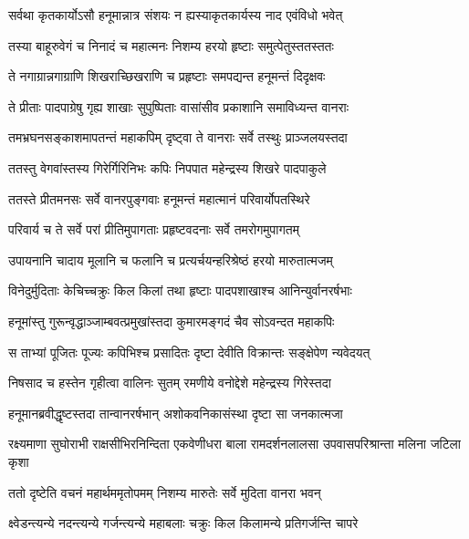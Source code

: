 \twolineshloka
{सर्वथा कृतकार्योऽसौ हनूमान्नात्र संशयः}
{न ह्यस्याकृतकार्यस्य नाद एवंविधो भवेत्} %

\twolineshloka
{तस्या बाहूरुवेगं च निनादं च महात्मनः}
{निशम्य हरयो हृष्टाः समुत्पेतुस्ततस्ततः} %

\twolineshloka
{ते नगाग्रान्नगाग्राणि शिखराच्छिखराणि च}
{प्रहृष्टाः समपद्यन्त हनूमन्तं दिदृक्षवः} %

\twolineshloka
{ते प्रीताः पादपाग्रेषु गृह्य शाखाः सुपुष्पिताः}
{वासांसीव प्रकाशानि समाविध्यन्त वानराः} %

\twolineshloka
{तमभ्रघनसङ्काशमापतन्तं महाकपिम्}
{दृष्ट्वा ते वानराः सर्वे तस्थुः प्राञ्जलयस्तदा} %

\twolineshloka
{ततस्तु वेगवांस्तस्य गिरेर्गिरिनिभः कपिः}
{निपपात महेन्द्रस्य शिखरे पादपाकुले} %

\twolineshloka
{ततस्ते प्रीतमनसः सर्वे वानरपुङ्गवाः}
{हनूमन्तं महात्मानं परिवार्योपतस्थिरे} %

\twolineshloka
{परिवार्य च ते सर्वे परां प्रीतिमुपागताः}
{प्रहृष्टवदनाः सर्वे तमरोगमुपागतम्} %

\twolineshloka
{उपायनानि चादाय मूलानि च फलानि च}
{प्रत्यर्चयन्हरिश्रेष्ठं हरयो मारुतात्मजम्} %

\twolineshloka
{विनेदुर्मुदिताः केचिच्चक्रुः किल किलां तथा}
{हृष्टाः पादपशाखाश्च आनिन्युर्वानरर्षभाः} %

\twolineshloka
{हनूमांस्तु गुरून्वृद्धाञ्जाम्बवत्प्रमुखांस्तदा}
{कुमारमङ्गदं चैव सोऽवन्दत महाकपिः} %

\twolineshloka
{स ताभ्यां पूजितः पूज्यः कपिभिश्च प्रसादितः}
{दृष्टा देवीति विक्रान्तः सङ्क्षेपेण न्यवेदयत्} %

\twolineshloka
{निषसाद च हस्तेन गृहीत्वा वालिनः सुतम्}
{रमणीये वनोद्देशे महेन्द्रस्य गिरेस्तदा} %

\twolineshloka
{हनूमानब्रवीद्धृष्टस्तदा तान्वानरर्षभान्}
{अशोकवनिकासंस्था दृष्टा सा जनकात्मजा} %

\threelineshloka
{रक्ष्यमाणा सुघोराभी राक्षसीभिरनिन्दिता}
{एकवेणीधरा बाला रामदर्शनलालसा}
{उपवासपरिश्रान्ता मलिना जटिला कृशा} %

\twolineshloka
{ततो दृष्टेति वचनं महार्थममृतोपमम्}
{निशम्य मारुतेः सर्वे मुदिता वानरा भवन्} %

\twolineshloka
{क्ष्वेडन्त्यन्ये नदन्त्यन्ये गर्जन्त्यन्ये महाबलाः}
{चक्रुः किल किलामन्ये प्रतिगर्जन्ति चापरे} %

